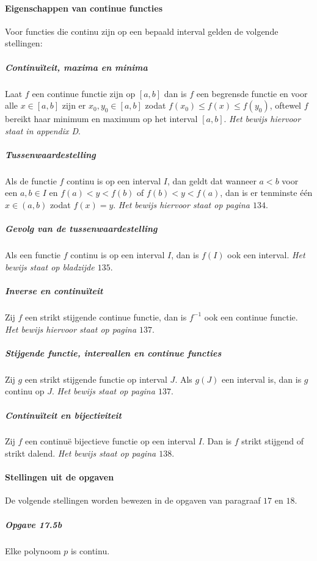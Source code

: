\paragraph{Eigenschappen van continue functies} Voor functies die continu zijn op een bepaald interval gelden de volgende stellingen:

\subparagraph{Continuïteit, maxima en minima} Laat $f$ een continue functie zijn op $[a,b]$ dan is $f$ een begrensde functie en voor alle $x\in[a,b]$ zijn er $x_{0},y_{0}\in[a,b]$ zodat $f(x_{0}) \leq f(x) \leq f(y_{0})$, oftewel $f$ bereikt haar minimum en maximum op het interval $[a,b]$. \textit{Het bewijs hiervoor staat in appendix D}.

\subparagraph{Tussenwaardestelling} Als de functie $f$ continu is op een interval $I$, dan geldt dat wanneer $a<b$ voor een $a,b \in I$ en $f(a)<y<f(b)$ of $f(b)<y<f(a)$, dan is er tenminste één $x\in(a,b)$ zodat $f(x)=y$. \textit{Het bewijs hiervoor staat op pagina $134$}.

\subparagraph{Gevolg van de tussenwaardestelling} Als een functie $f$ continu is op een interval $I$, dan is $f(I)$ ook een interval. \textit{Het bewijs staat op bladzijde $135$}.

\subparagraph{Inverse en continuïteit} Zij $f$ een strikt stijgende continue functie, dan is $f^{-1}$ ook een continue functie. \textit{Het bewijs hiervoor staat op pagina $137$}.

\subparagraph{Stijgende functie, intervallen en continue functies} Zij $g$ een strikt stijgende functie op interval $J$. Als $g(J)$ een interval is, dan is $g$ continu op $J$. \textit{Het bewijs staat op pagina $137$}.

\subparagraph{Continuïteit en bijectiviteit} Zij $f$ een continuë bijectieve functie op een interval $I$. Dan is $f$ strikt stijgend of strikt dalend. \textit{Het bewijs staat op pagina $138$}.

\paragraph{Stellingen uit de opgaven} De volgende stellingen worden bewezen in de opgaven van paragraaf $17$ en $18$.

\subparagraph{Opgave 17.5b} Elke polynoom $p$ is continu.